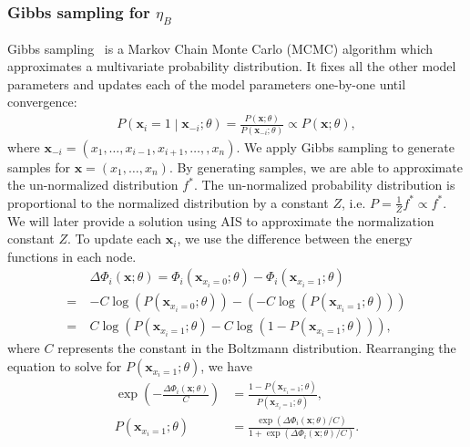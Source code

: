 \documentclass[letterpaper]{article} %
\begin{document}
			\subsubsection{Gibbs sampling for $\eta_B$}
				Gibbs sampling~\cite{geman1984stochastic} is a Markov Chain Monte Carlo (MCMC) algorithm which approximates a multivariate probability distribution. It fixes all the other model parameters and updates each of the model parameters one-by-one until convergence:
				\begin{align*}
					P \left( \mathbf{x}_i =1 \middle| \mathbf{x}_{-i}; \theta \right) = \frac{P \left( \mathbf{x}; \theta \right)}{P \left( \mathbf{x}_{-i}; \theta \right)} \propto P \left( \mathbf{x}; \theta \right),
				\end{align*}
				where $\mathbf{x}_{-i}= (x_{1}, \ldots, x_{i-1}, x_{i+1}, \ldots, , x_{n})$. We apply Gibbs sampling to generate samples for $\mathbf{x} = \left( x_1, \ldots, x_n \right)$. By generating samples, we are able to approximate the un-normalized distribution $f^{*}$. The un-normalized probability distribution is proportional to the normalized distribution by a constant $Z$, i.e. $P = \frac{1}{Z} f^{*} \propto f^{*}$. We will later provide a solution using AIS to approximate the normalization constant $Z$. To update each $\mathbf{x}_i$, we use the difference between the energy functions in each node.
				\begin{align*}
				    &\Delta \Phi_i \left( \mathbf{x} ; \theta \right) = \Phi_i \left( \mathbf{x}_{x_i = 0}; \theta \right) - \Phi_i \left( \mathbf{x}_{x_i = 1}; \theta \right) \\
					=\ &- C \log \left( P \left( \mathbf{x}_{x_i = 0}; \theta \right) \right) - \left(- C \log \left( P \left( \mathbf{x}_{x_i = 1}; \theta \right) \right) \right) \\
					=\ &C \log \left( P \left( \mathbf{x}_{x_i = 1}; \theta \right) - C \log \left( 1 - P \left( \mathbf{x}_{x_i = 1}; \theta \right) \right) \right),
				\end{align*}
				where $C$ represents the constant in the Boltzmann distribution. Rearranging the equation to solve for $P \left( \mathbf{x}_{x_i = 1}; \theta \right) $, we have
				\begin{align*}
					\exp \left( - \frac{\Delta \Phi_i \left( \mathbf{x}; \theta \right)}{C} \right) &= \frac{1 - P \left( \mathbf{x}_{x_i = 1}; \theta \right)}{P \left( \mathbf{x}_{x_i = 1}; \theta \right)}, \\
					P \left( \mathbf{x}_{x_i = 1}; \theta \right) &= \frac{\exp \left( \Delta \Phi_i \left( \mathbf{x}; \theta \right) / C \right)}{1 + \exp \left( \Delta \Phi_i \left( \mathbf{x}; \theta \right) / C \right)}.
				\end{align*}
\end{document}
